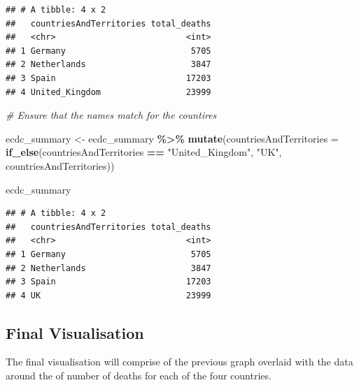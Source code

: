 \documentclass[
]{article}
\newenvironment{Shaded}{\begin{snugshade}}{\end{snugshade}}
\newcommand{\AttributeTok}[1]{\textcolor[rgb]{0.13,0.29,0.53}{#1}}
\newcommand{\CommentTok}[1]{\textcolor[rgb]{0.56,0.35,0.01}{\textit{#1}}}
\newcommand{\FunctionTok}[1]{\textcolor[rgb]{0.13,0.29,0.53}{\textbf{#1}}}
\newcommand{\NormalTok}[1]{#1}
\newcommand{\OtherTok}[1]{\textcolor[rgb]{0.56,0.35,0.01}{#1}}
\newcommand{\SpecialCharTok}[1]{\textcolor[rgb]{0.81,0.36,0.00}{\textbf{#1}}}
\newcommand{\StringTok}[1]{\textcolor[rgb]{0.31,0.60,0.02}{#1}}
\begin{document}
\begin{verbatim}
## # A tibble: 4 x 2
##   countriesAndTerritories total_deaths
##   <chr>                          <int>
## 1 Germany                         5705
## 2 Netherlands                     3847
## 3 Spain                          17203
## 4 United_Kingdom                 23999
\end{verbatim}

\begin{Shaded}
\begin{Highlighting}[]
\CommentTok{\# Ensure that the names match for the countires}

\NormalTok{ecdc\_summary }\OtherTok{\textless{}{-}}\NormalTok{ ecdc\_summary }\SpecialCharTok{\%\textgreater{}\%}
  \FunctionTok{mutate}\NormalTok{(}\AttributeTok{countriesAndTerritories =} \FunctionTok{if\_else}\NormalTok{(countriesAndTerritories }\SpecialCharTok{==} \StringTok{"United\_Kingdom"}\NormalTok{, }\StringTok{"UK"}\NormalTok{, countriesAndTerritories))}

\NormalTok{ecdc\_summary}
\end{Highlighting}
\end{Shaded}

\begin{verbatim}
## # A tibble: 4 x 2
##   countriesAndTerritories total_deaths
##   <chr>                          <int>
## 1 Germany                         5705
## 2 Netherlands                     3847
## 3 Spain                          17203
## 4 UK                             23999
\end{verbatim}

\subsection{Final Visualisation}\label{final-visualisation}

The final visualisation will comprise of the previous graph overlaid
with the data around the of number of deaths for each of the four
countries.
\end{document}
